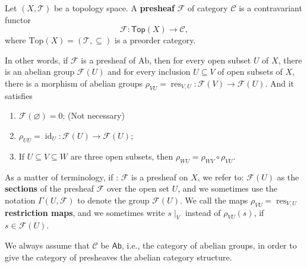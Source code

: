 \documentclass[11pt]{article}
\begin{document}
\begin{definition}
    Let $(X,\mathcal{T})$ be a topology space. 
    A \textbf{presheaf} $\mathscr{F}$ of  category $\mathcal{C}$ 
    is a contravariant functor 
    $$\mathscr{F}: \mathsf{Top}(X) \to \mathscr{C},$$
    where $\mathrm{Top}(X) = (\mathcal{T}, \subseteq)$ 
    is a preorder category. 
    
    In other words, if $\mathscr{F}$ is a presheaf of $\mathrm{Ab}$, 
    then for every open subset $U$ of $X$, 
    there is an abelian group $\mathscr{F}(U)$ and for every 
    inclusion $U \subseteq V$ of open subsets of $X$, 
    there is a morphism of abelian groups 
    $\rho_{VU} = \operatorname{res}_{V,U} : \mathscr{F} (V) \to \mathscr{F} (U)$. 
    And it satisfies
    \begin{enumerate}[label=(\arabic*)]
        \item $\mathscr{F}(\varnothing) = 0$; (Not necessary)
        \item $\rho_{UU}=\operatorname{id}_{U}:\mathscr{F}(U) \to \mathscr{F}(U)$; 
        \item If $U \subseteq V \subseteq W$ are three open subsets, 
        then $\rho_{WU}=\rho_{WV}  \circ \rho_{VU}$. 
    \end{enumerate}

    \begin{center}
    \end{center}

    As a matter of terminology, if : $\mathscr{F}$ is a presheaf on $X$, 
    we refer to: $\mathscr{F} ( U)$ as the \textbf{sections} of 
    the presheaf $\mathscr{F}$ over the open set $U$, 
    and we sometimes use the notation $\Gamma(U,\mathscr{F})$ 
    to denote the group $\mathscr{F}(U)$. 
    We call the maps $\rho_{VU}= \operatorname{res}_{V,U}$ 
    \textbf{restriction maps}, and we sometimes 
    write $s\mid_{V}$ instead of $\rho_{VU}(s)$, 
    if $s \in \mathscr{F}(U)$. 

    We always assume that $ \mathcal{C} $ be 
    $ \mathsf{Ab} $, i.e., the category of abelian groups, 
    in order to give the category of presheaves the abelian 
    category structure. 
\end{definition}
\end{document}
